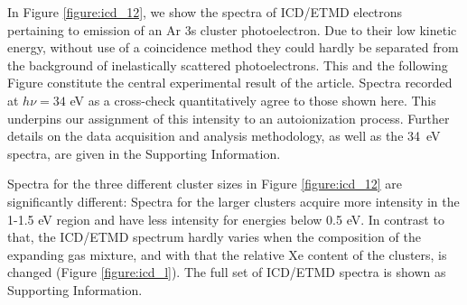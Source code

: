 \documentclass[journal=jpccck,manuscript=article]{achemso}
\begin{document}
%
In Figure \ref{figure:icd_12}, we show the spectra of ICD/ETMD electrons pertaining to emission of an Ar 3s cluster photoelectron. 
Due to their low kinetic energy, without use of a coincidence method they could hardly be separated from the background of inelastically scattered photoelectrons.\cite{mucke}
This and the following Figure constitute the central experimental result of the article.
Spectra recorded at $h\nu = 34$ eV as a cross-check quantitatively agree to those shown here.
This underpins our assignment of this intensity to an autoionization process.
Further details on the data acquisition and analysis methodology, as well as the 34~eV spectra, are given in the Supporting Information.

Spectra for the three different cluster sizes in Figure \ref{figure:icd_12} are significantly different: Spectra for the larger clusters acquire more intensity in the 1-1.5 eV region and have less intensity for energies below 0.5 eV.
In contrast to that, the ICD/ETMD spectrum hardly varies when the composition of the expanding gas mixture, and with that the relative Xe content of the clusters, is changed (Figure \ref{figure:icd_l}).
The full set of ICD/ETMD spectra is shown as Supporting Information.
\end{document}
